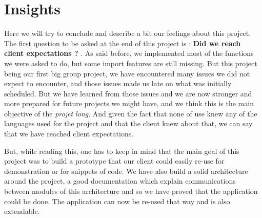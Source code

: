\section{Insights}
Here we will try to conclude and describe a bit our feelings about this project. The first question to be asked at the end of this project is : \textbf{Did we reach client expectations ?} . 
As said before, we implemented most of the functions we were asked to do, but some import features are still missing. But this project being our first big group project, we have encountered many issues we did not expect
to encounter, and those issues made us late on what was initially scheduled. But we have learned from those issues and we are now stronger and more prepared for future projects we might have, and we think this is the 
main objective of the \textit{projet long}. And given the fact that none of use knew any of the languages used for the project and that the client knew about that, we can say that we have reached client expectations.

But, while reading this, one has to keep in mind that the main goal of this project was to build a prototype that our client could easily re-use for demonstration or for snippets of code. We have also build a solid 
architecture around the project, a good documentation which explain communications between modules of this architecture	and so we have proved that the application could be done. The application can now be re-used that way and is 
also extendable.


